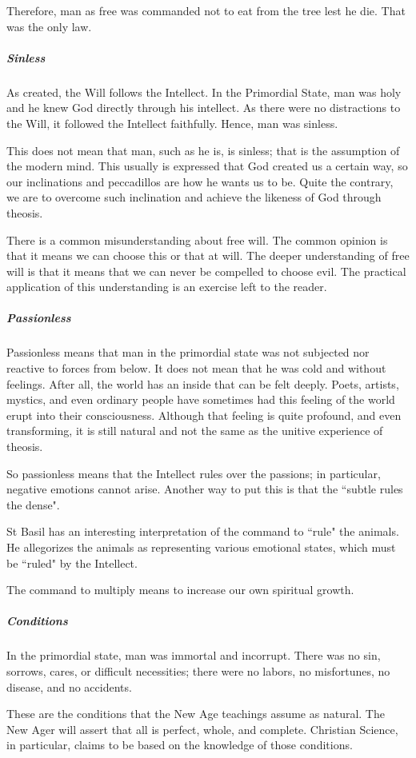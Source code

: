Therefore, man as free was commanded not to eat from the tree lest he die. That was the only law.

\subparagraph{Sinless}
As created, the Will follows the Intellect. In the Primordial State, man was holy and he knew God directly through his intellect. As there were no distractions to the Will, it followed the Intellect faithfully. Hence, man was sinless.

This does not mean that man, such as he is, is sinless; that is the assumption of the modern mind. This usually is expressed that God created us a certain way, so our inclinations and peccadillos are how he wants us to be. Quite the contrary, we are to overcome such inclination and achieve the likeness of God through theosis.

There is a common misunderstanding about free will. The common opinion is that it means we can choose this or that at will. The deeper understanding of free will is that it means that we can never be compelled to choose evil. The practical application of this understanding is an exercise left to the reader.

\subparagraph{Passionless}
Passionless means that man in the primordial state was not subjected nor reactive to forces from below. It does not mean that he was cold and without feelings. After all, the world has an inside that can be felt deeply. Poets, artists, mystics, and even ordinary people have sometimes had this feeling of the world erupt into their consciousness. Although that feeling is quite profound, and even transforming, it is still natural and not the same as the unitive experience of theosis.

So passionless means that the Intellect rules over the passions; in particular, negative emotions cannot arise. Another way to put this is that the ``subtle rules the dense".

St Basil has an interesting interpretation of the command to ``rule" the animals. He allegorizes the animals as representing various emotional states, which must be ``ruled" by the Intellect.

The command to multiply means to increase our own spiritual growth.

\subparagraph{Conditions}
In the primordial state, man was immortal and incorrupt. There was no sin, sorrows, cares, or difficult necessities; there were no labors, no misfortunes, no disease, and no accidents.

These are the conditions that the New Age teachings assume as natural. The New Ager will assert that all is perfect, whole, and complete. Christian Science, in particular, claims to be based on the knowledge of those conditions.

